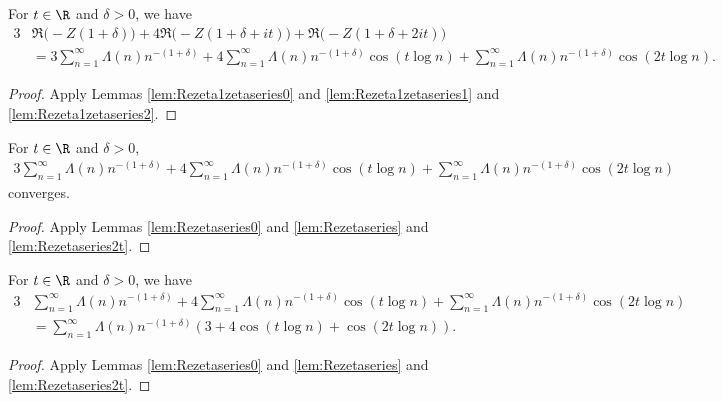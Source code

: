 \begin{lemma}[341 series]\label{lem:341Zseries}  \leanok
For $t\in\R$ and $\delta>0$, we have
\begin{align*}
3&\Re\big(-Z(1+\delta)\big) + 4\Re\big(-Z(1+\delta+it)\big) + \Re\big(-Z(1+\delta+2it)\big)\\
&= 3\sum_{n=1}^{\infty} \Lambda(n) n^{-(1+\delta)}
+4\sum_{n=1}^{\infty} \Lambda(n) n^{-(1+\delta)}\cos(t\log n)
+\sum_{n=1}^{\infty} \Lambda(n) n^{-(1+\delta)}\cos(2t\log n).
\end{align*}
\end{lemma}
\begin{proof} \leanok {}
Apply Lemmas \ref{lem:Rezeta1zetaseries0} and \ref{lem:Rezeta1zetaseries1} and \ref{lem:Rezeta1zetaseries2}.
\end{proof}

\begin{lemma}\label{lem:341seriesConv}  \leanok
For $t\in\R$ and $\delta>0$,
\begin{align*}
3 \sum_{n=1}^{\infty} \Lambda(n) n^{-(1+\delta)}
+4\sum_{n=1}^{\infty} \Lambda(n) n^{-(1+\delta)}\cos(t\log n)
+\sum_{n=1}^{\infty} \Lambda(n) n^{-(1+\delta)}\cos(2t\log n)
\end{align*}
converges.
\end{lemma}
\begin{proof} \leanok {}
Apply Lemmas \ref{lem:Rezetaseries0} and \ref{lem:Rezetaseries} and \ref{lem:Rezetaseries2t}.
\end{proof}


\begin{lemma}\label{lem:341series}  \leanok
For $t\in\R$ and $\delta>0$, we have
\begin{align*}
3& \sum_{n=1}^{\infty} \Lambda(n) n^{-(1+\delta)}
+4\sum_{n=1}^{\infty} \Lambda(n) n^{-(1+\delta)}\cos(t\log n)
+\sum_{n=1}^{\infty} \Lambda(n) n^{-(1+\delta)}\cos(2t\log n)\\
& =  \sum_{n=1}^{\infty} \Lambda(n) n^{-(1+\delta)}(3 + 4\cos(t\log n) + \cos(2t\log n)).
\end{align*}
\end{lemma}
\begin{proof} \leanok {}
Apply Lemmas \ref{lem:Rezetaseries0} and \ref{lem:Rezetaseries} and \ref{lem:Rezetaseries2t}.
\end{proof}

